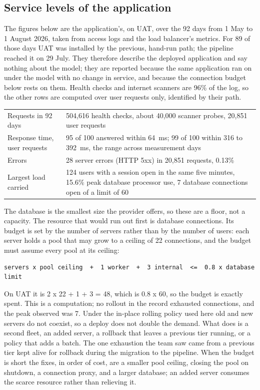 \documentclass[11pt]{article}
\begin{document}
\subsection{Service levels of the application}

The figures below are the application's, on UAT, over the 92 days from 1 May to 1 August 2026, taken from access logs and the load balancer's metrics. For 89 of those days UAT was installed by the previous, hand-run path; the pipeline reached it on 29 July. They therefore describe the deployed application and say nothing about the model; they are reported because the same application ran on under the model with no change in service, and because the connection budget below rests on them. Health checks and internet scanners are 96\% of the log, so the other rows are computed over user requests only, identified by their path.

\begin{center}
\begin{tabularx}{\textwidth}{@{}lX@{}}
\toprule
Requests in 92 days & 504{,}616 health checks, about 40{,}000 scanner probes, 20{,}851 user requests \\
Response time, user requests & 95 of 100 answered within 64~ms; 99 of 100 within 316 to 392~ms, the range across measurement days \\
Errors & 28 server errors (HTTP 5xx) in 20{,}851 requests, 0.13\% \\
Largest load carried & 124 users with a session open in the same five minutes, 15.6\% peak database processor use, 7 database connections open of a limit of 60 \\
\bottomrule
\end{tabularx}
\end{center}

The database is the smallest size the provider offers, so these are a floor, not a capacity. The resource that would run out first is database connections. Its budget is set by the number of servers rather than by the number of users: each server holds a pool that may grow to a ceiling of 22 connections, and the budget must assume every pool at its ceiling:

\begin{lstlisting}
servers x pool ceiling  +  1 worker  +  3 internal  <=  0.8 x database limit
\end{lstlisting}

On UAT it is 2 x 22 + 1 + 3 = 48, which is 0.8 x 60, so the budget is exactly spent. This is a computation; no rollout in the record exhausted connections, and the peak observed was 7. Under the in-place rolling policy used here old and new servers do not coexist, so a deploy does not double the demand. What does is a second fleet, an added server, a rollback that leaves a previous tier running, or a policy that adds a batch. The one exhaustion the team saw came from a previous tier kept alive for rollback during the migration to the pipeline. When the budget is short the fixes, in order of cost, are a smaller pool ceiling, closing the pool on shutdown, a connection proxy, and a larger database; an added server consumes the scarce resource rather than relieving it.
\end{document}
